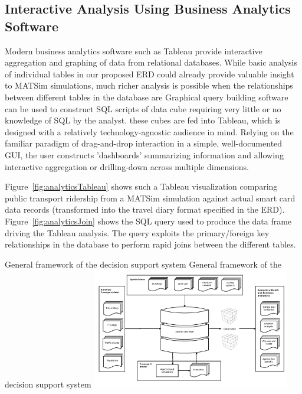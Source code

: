 \subsection{Interactive Analysis Using Business Analytics Software}
Modern business analytics software such as Tableau \citep{Tableau_Webpage_2013} provide interactive aggregation and graphing of data from relational databases. While basic analysis of individual tables in our proposed ERD could already provide valuable insight to MATSim simulations, much richer analysis is possible when the relationships between different tables in the database are Graphical query building software can be used to construct SQL scripts of data cube requiring very little or no knowledge of SQL by the analyst. these cubes are fed into Tableau, which is designed with a relatively technology-agnostic audience in mind. Relying on the familiar paradigm of drag-and-drop interaction in a simple, well-documented GUI, the user constructs 'dashboards' summarizing information and allowing interactive aggregation or drilling-down across multiple dimensions.

Figure~\ref{fig:analyticsTableau} shows such a Tableau visualization comparing public transport ridership from a MATSim simulation against actual smart card data records (transformed into the travel diary format specified in the ERD). Figure~\ref{fig:analyticsJoin} shows the SQL query used to produce the data frame driving the Tableau analysis. The query exploits the primary/foreign key relationships in the database to perform rapid joins between the different tables.

\createfigure%
{General framework of the decision support system}%
{General framework of the decision support system}%
{\label{fig:analyticsFramework}}%
{\includegraphics[width=0.65\textwidth, angle=0]{extending/figures/businessanalytics/general}}%
{}


